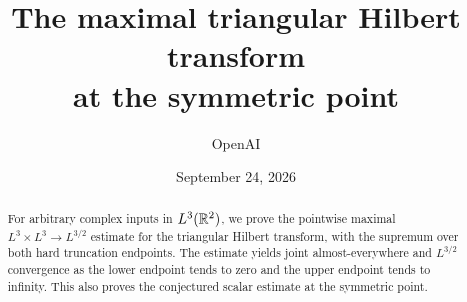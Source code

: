 
\title{The maximal triangular Hilbert transform\\at the symmetric point}
\author{OpenAI}
\date{September 24, 2026}

\maketitle
\begin{abstract}
For arbitrary complex inputs in $L^3(\mathbb R^2)$, we prove the pointwise
maximal $L^3\times L^3\to L^{3/2}$ estimate for the triangular Hilbert
transform, with the supremum over both hard truncation endpoints.
The estimate yields joint almost-everywhere and $L^{3/2}$ convergence
as the lower endpoint tends to zero and the upper endpoint tends to infinity.
This also proves the conjectured scalar estimate at the symmetric point.
\end{abstract}
\tableofcontents










